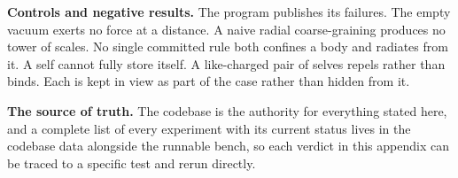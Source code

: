 \textbf{Controls and negative results.} The program publishes its failures. The empty vacuum exerts no force at a distance. A naive radial coarse-graining produces no tower of scales. No single committed rule both confines a body and radiates from it. A self cannot fully store itself. A like-charged pair of selves repels rather than binds. Each is kept in view as part of the case rather than hidden from it.

\textbf{The source of truth.} The codebase is the authority for everything stated here, and a complete list of every experiment with its current status lives in the codebase data alongside the runnable bench, so each verdict in this appendix can be traced to a specific test and rerun directly. \cite{pollard2026vibetest}
